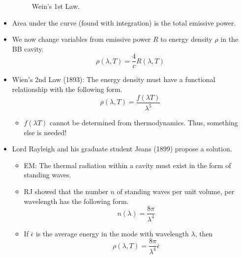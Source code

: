 \documentclass[../notes.tex]{subfiles}
\begin{document}
\begin{itemize}
\begin{figure}[h!]
        \caption{Wein's 1st Law.}
        \label{fig:WeinLaw1}
    \end{figure}
    \item Area under the curve (found with integration) is the total emissive power.
    \item We now change variables from emissive power $R$ to energy density $\rho$ in the BB cavity.
    \begin{equation*}
        \rho(\lambda,T) = \frac{4}{c}R(\lambda,T)
    \end{equation*}
    \item Wien's 2nd Law (1893): The energy density must have a functional relationship with the following form.
    \begin{equation*}
        \rho(\lambda,T) = \frac{f(\lambda T)}{\lambda^5}
    \end{equation*}
    \begin{itemize}
        \item $f(\lambda T)$ cannot be determined from thermodynamics. Thus, something else is needed!
    \end{itemize}
    \item Lord Rayleigh and his graduate student Jeans (1899) propose a solution.
    \begin{itemize}
        \item EM: The thermal radiation within a cavity must exist in the form of standing waves.
        \item RJ showed that the number $n$ of standing waves per unit volume, per wavelength has the following form.
        \begin{equation*}
            n(\lambda) = \frac{8\pi}{\lambda^4}
        \end{equation*}
        \item If $\bar{\epsilon}$ is the average energy in the mode with wavelength $\lambda$, then
        \begin{equation*}
            \rho(\lambda,T) = \frac{8\pi}{\lambda^4}\bar{\epsilon}

\end{equation*}
\end{itemize}
\end{itemize}
\end{document}

